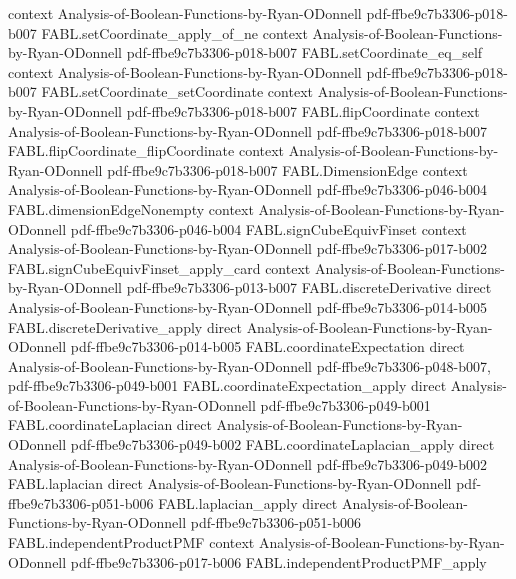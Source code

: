 \begin{theorem}
  {context}
  {Analysis-of-Boolean-Functions-by-Ryan-ODonnell}
  {pdf-ffbe9c7b3306-p018-b007}
\proofstep
  {FABL.setCoordinate_apply_of_ne}
  {context}
  {Analysis-of-Boolean-Functions-by-Ryan-ODonnell}
  {pdf-ffbe9c7b3306-p018-b007}
\proofstep
  {FABL.setCoordinate_eq_self}
  {context}
  {Analysis-of-Boolean-Functions-by-Ryan-ODonnell}
  {pdf-ffbe9c7b3306-p018-b007}
\proofstep
  {FABL.setCoordinate_setCoordinate}
  {context}
  {Analysis-of-Boolean-Functions-by-Ryan-ODonnell}
  {pdf-ffbe9c7b3306-p018-b007}
\proofstep
  {FABL.flipCoordinate}
  {context}
  {Analysis-of-Boolean-Functions-by-Ryan-ODonnell}
  {pdf-ffbe9c7b3306-p018-b007}
\proofstep
  {FABL.flipCoordinate_flipCoordinate}
  {context}
  {Analysis-of-Boolean-Functions-by-Ryan-ODonnell}
  {pdf-ffbe9c7b3306-p018-b007}
\proofstep
  {FABL.DimensionEdge}
  {context}
  {Analysis-of-Boolean-Functions-by-Ryan-ODonnell}
  {pdf-ffbe9c7b3306-p046-b004}
\proofstep
  {FABL.dimensionEdgeNonempty}
  {context}
  {Analysis-of-Boolean-Functions-by-Ryan-ODonnell}
  {pdf-ffbe9c7b3306-p046-b004}
\proofstep
  {FABL.signCubeEquivFinset}
  {context}
  {Analysis-of-Boolean-Functions-by-Ryan-ODonnell}
  {pdf-ffbe9c7b3306-p017-b002}
\proofstep
  {FABL.signCubeEquivFinset_apply_card}
  {context}
  {Analysis-of-Boolean-Functions-by-Ryan-ODonnell}
  {pdf-ffbe9c7b3306-p013-b007}
\proofstep
  {FABL.discreteDerivative}
  {direct}
  {Analysis-of-Boolean-Functions-by-Ryan-ODonnell}
  {pdf-ffbe9c7b3306-p014-b005}
\proofstep
  {FABL.discreteDerivative_apply}
  {direct}
  {Analysis-of-Boolean-Functions-by-Ryan-ODonnell}
  {pdf-ffbe9c7b3306-p014-b005}
\proofstep
  {FABL.coordinateExpectation}
  {direct}
  {Analysis-of-Boolean-Functions-by-Ryan-ODonnell}
  {pdf-ffbe9c7b3306-p048-b007,
    pdf-ffbe9c7b3306-p049-b001}
\proofstep
  {FABL.coordinateExpectation_apply}
  {direct}
  {Analysis-of-Boolean-Functions-by-Ryan-ODonnell}
  {pdf-ffbe9c7b3306-p049-b001}
\proofstep
  {FABL.coordinateLaplacian}
  {direct}
  {Analysis-of-Boolean-Functions-by-Ryan-ODonnell}
  {pdf-ffbe9c7b3306-p049-b002}
\proofstep
  {FABL.coordinateLaplacian_apply}
  {direct}
  {Analysis-of-Boolean-Functions-by-Ryan-ODonnell}
  {pdf-ffbe9c7b3306-p049-b002}
\proofstep
  {FABL.laplacian}
  {direct}
  {Analysis-of-Boolean-Functions-by-Ryan-ODonnell}
  {pdf-ffbe9c7b3306-p051-b006}
\proofstep
  {FABL.laplacian_apply}
  {direct}
  {Analysis-of-Boolean-Functions-by-Ryan-ODonnell}
  {pdf-ffbe9c7b3306-p051-b006}
\proofstep
  {FABL.independentProductPMF}
  {context}
  {Analysis-of-Boolean-Functions-by-Ryan-ODonnell}
  {pdf-ffbe9c7b3306-p017-b006}
\proofstep
  {FABL.independentProductPMF_apply}

\end{theorem}
